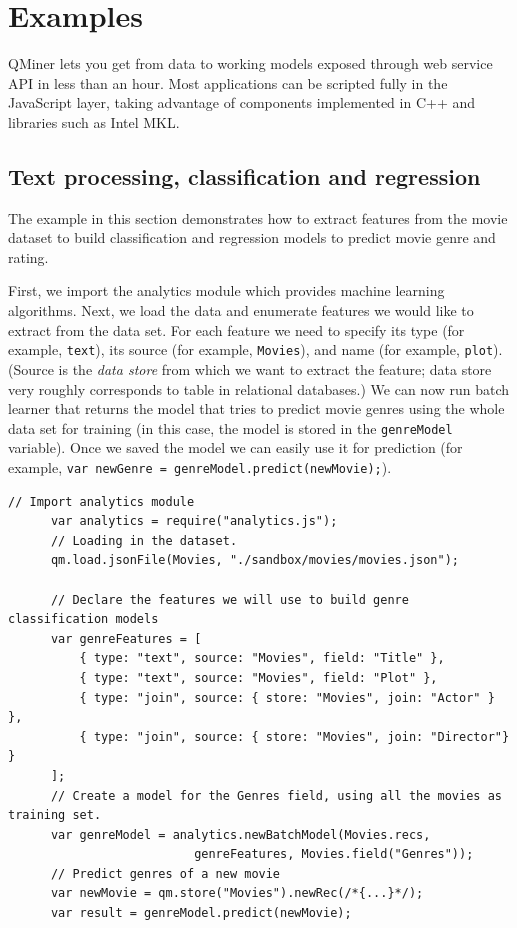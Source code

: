 \documentclass{article} %
\begin{document}
\section{Examples}

QMiner lets you get from data to working models exposed through web service API in less than an hour. Most applications can be scripted fully in the JavaScript layer, taking advantage of components implemented in C++ and libraries such as Intel MKL.

\subsection{Text processing, classification and regression}

The example in this section demonstrates how to extract features from the movie dataset to build classification and regression models to predict movie genre and rating.

      First, we import the analytics module which provides machine learning algorithms. Next, we load the data and enumerate features we would like to extract from the data set. For each feature we need to specify its type (for example, \texttt{text}), its source (for example, \texttt{Movies}), and name (for example, \texttt{plot}). (Source is the \emph{data store} from which we want to extract the feature; data store very roughly corresponds to table in relational databases.) We can now run batch learner that returns the model that tries to predict movie genres using the whole data set for training (in this case, the model is stored in the \texttt{genreModel} variable). Once we saved the model we can easily use it for prediction (for example, \texttt{var newGenre = genreModel.predict(newMovie);}).

      \begin{lstlisting}[caption={Text mining: storage, feature extraction, classification and regression}] 	
      // Import analytics module
      var analytics = require("analytics.js");
      // Loading in the dataset.
      qm.load.jsonFile(Movies, "./sandbox/movies/movies.json");
       	
      // Declare the features we will use to build genre classification models
      var genreFeatures = [
          { type: "text", source: "Movies", field: "Title" },
          { type: "text", source: "Movies", field: "Plot" },
          { type: "join", source: { store: "Movies", join: "Actor" } },
          { type: "join", source: { store: "Movies", join: "Director"} }
      ];
      // Create a model for the Genres field, using all the movies as training set.
      var genreModel = analytics.newBatchModel(Movies.recs,
                          genreFeatures, Movies.field("Genres"));
      // Predict genres of a new movie
      var newMovie = qm.store("Movies").newRec(/*{...}*/);
      var result = genreModel.predict(newMovie);
      \end{lstlisting}
\end{document}
